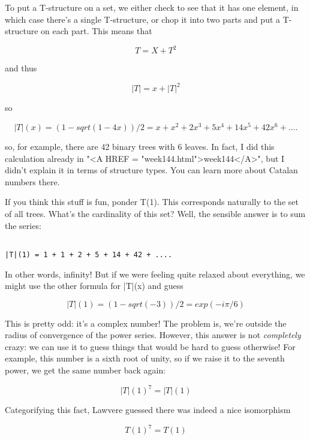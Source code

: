 To put a T-structure on a set, we either check to see that it has one
element, in which case there's a single T-structure, or chop it into
two parts and put a T-structure on each part.  This means that


$$

T = X + T^{2}
$$
    
and thus


$$

|T| = x + |T|^{2}
$$
    
so 


$$

|T|(x) = (1 - sqrt(1 - 4x))/2 

       =  x + x^{2} + 2x^{3} + 5x^{4} + 14x^{5} + 42x^{6} + ....
$$
    
so, for example, there are 42 binary trees with 6 leaves.  In fact, I did
this calculation already in "<A HREF = "week144.html">week144</A>", but I didn't explain it in terms
of structure types.  You can learn more about Catalan numbers there.

If you think this stuff is fun, ponder T(1).  This
corresponds naturally to the set of all trees. 
What's the cardinality of this set?  Well, the sensible answer
is to sum the series:

\begin{verbatim}

|T|(1) = 1 + 1 + 2 + 5 + 14 + 42 + ....
\end{verbatim}
    
In other words, infinity!  But if we were feeling
quite relaxed about everything, we might use the other formula
for |T|(x) and guess


$$

|T|(1) = (1 - sqrt(-3))/2

       = exp(-i \pi /6)
$$
    
This is pretty odd: it's a complex number!   The problem is, we're
outside the radius of convergence of the power series.
However, this answer is not \emph{completely} crazy: we can use
it to guess things that would be hard to guess otherwise!
For example, this number is a sixth root of unity, so if we
raise it to the seventh power, we get the same
number back again:

$$

|T|(1)^{7} = |T|(1)
$$
    

Categorifying this fact, Lawvere guessed there was indeed a nice
isomorphism 


$$

T(1)^{7} = T(1)
$$
    

